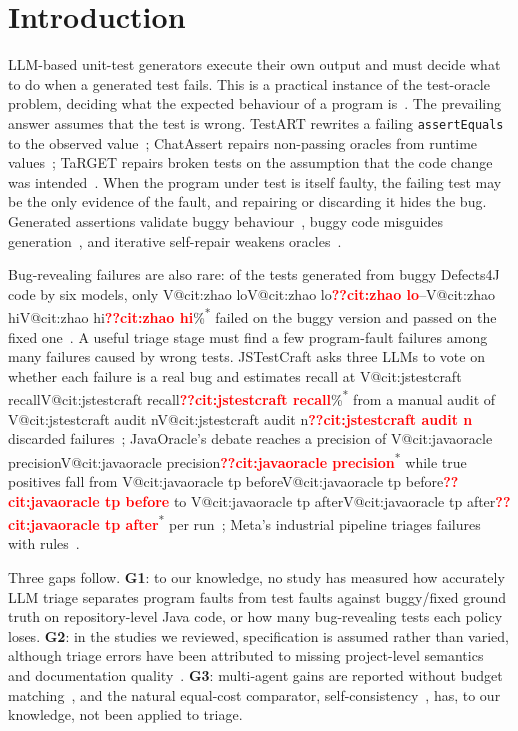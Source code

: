 \documentclass[pdflatex,iicol,sn-mathphys-num]{sn-jnl}
\makeatletter
\newcommand{\V}[1]{\ifcsname V@#1\endcsname\csname V@#1\endcsname\else\textbf{\textcolor{red}{??#1}}\fi}
\newcommand{\cited}{\textsuperscript{*}}
\makeatother
\begin{document}
\maketitle

\section{Introduction}\label{sec:intro}

LLM-based unit-test generators execute their own output and must decide what to do when a generated test fails. This is a practical instance of the test-oracle problem, deciding what the expected behaviour of a program is~\cite{barr2015oracle}. The prevailing answer assumes that the test is wrong. TestART rewrites a failing \texttt{assertEquals} to the observed value~\cite{gu2026testart}; ChatAssert repairs non-passing oracles from runtime values~\cite{hayet2025chatassert}; TaRGET repairs broken tests on the assumption that the code change was intended~\cite{yaraghi2025target}. When the program under test is itself faulty, the failing test may be the only evidence of the fault, and repairing or discarding it hides the bug. Generated assertions validate buggy behaviour~\cite{mathews2026validate}, buggy code misguides generation~\cite{zhao2026misguidance}, and iterative self-repair weakens oracles~\cite{li2026selfrepair}.

Bug-revealing failures are also rare: of the tests generated from buggy Defects4J code by six models, only \V{cit:zhao lo}--\V{cit:zhao hi}\%\cited{} failed on the buggy version and passed on the fixed one~\cite{zhao2026misguidance}. A useful triage stage must find a few program-fault failures among many failures caused by wrong tests. JSTestCraft asks three LLMs to vote on whether each failure is a real bug and estimates recall at \V{cit:jstestcraft recall}\%\cited{} from a manual audit of \V{cit:jstestcraft audit n} discarded failures~\cite{liu2026jstestcraft}; JavaOracle's debate reaches a precision of \V{cit:javaoracle precision}\cited{} while true positives fall from \V{cit:javaoracle tp before} to \V{cit:javaoracle tp after}\cited{} per run~\cite{fu2026javaoracle}; Meta's industrial pipeline triages failures with rules~\cite{maddila2026agentic}.

Three gaps follow. \textbf{G1}: to our knowledge, no study has measured how accurately LLM triage separates program faults from test faults against buggy/fixed ground truth on repository-level Java code, or how many bug-revealing tests each policy loses. \textbf{G2}: in the studies we reviewed, specification is assumed rather than varied, although triage errors have been attributed to missing project-level semantics~\cite{liu2026jstestcraft} and documentation quality~\cite{fu2026javaoracle}. \textbf{G3}: multi-agent gains are reported without budget matching~\cite{xie2026maco,xu2026candor,liu2026jstestcraft}, and the natural equal-cost comparator, self-consistency~\cite{wang2023selfconsistency}, has, to our knowledge, not been applied to triage.
\end{document}

